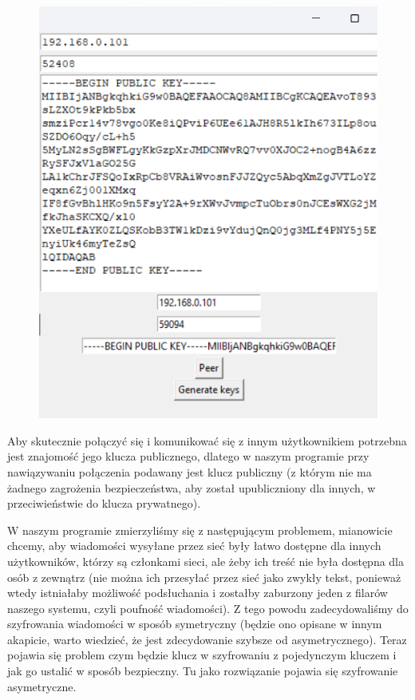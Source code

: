 \begin{figure}[H]
    \centering
    \includegraphics[width=\textwidth]{Images/CodeX13.png}
\end{figure}
Aby skutecznie połączyć się i komunikować się z innym użytkownikiem potrzebna jest znajomość jego klucza publicznego, dlatego w naszym programie przy nawiązywaniu połączenia podawany jest klucz publiczny (z którym nie ma żadnego zagrożenia bezpieczeństwa, aby został upubliczniony dla innych, w przeciwieństwie do klucza prywatnego).

\vspace{1em}

W naszym programie zmierzyliśmy się z następującym problemem, mianowicie chcemy, aby wiadomości wysyłane przez sieć były łatwo dostępne dla innych użytkowników, którzy są członkami sieci, ale żeby ich treść nie była dostępna dla osób z zewnątrz (nie można ich przesyłać przez sieć jako zwykły tekst, ponieważ wtedy istniałaby możliwość podsłuchania i zostałby zaburzony jeden z filarów naszego systemu, czyli poufność wiadomości). Z tego powodu zadecydowaliśmy do szyfrowania wiadomości w sposób symetryczny (będzie ono opisane w innym akapicie, warto wiedzieć, że jest zdecydowanie szybsze od asymetrycznego). Teraz pojawia się problem czym będzie klucz w szyfrowaniu z pojedynczym kluczem i jak go ustalić w sposób bezpieczny. Tu jako rozwiązanie pojawia się szyfrowanie asymetryczne.

